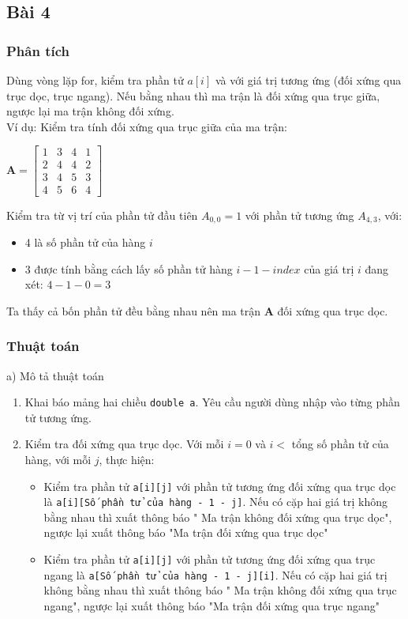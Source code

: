 \documentclass[a4paper]{article}
\begin{document}
\subsection{Bài 4}
\subsubsection{Phân tích}
Dùng vòng lặp for, kiểm tra phần tử $a[i]$ và với giá trị tương ứng (đối xứng qua trục dọc, trục ngang). Nếu bằng nhau thì ma trận là đối xứng qua trục giữa, ngược lại ma trận không đối xứng.\\

Ví dụ: Kiểm tra tính đối xứng qua trục giữa của ma trận:

$ \mathbf{A} = \begin{bmatrix}
1 & 3 & 4 & 1 \\
2 & 4 & 4 & 2 \\
3 & 4 & 5 & 3 \\
4 & 5 & 6 & 4 
\end{bmatrix}  $

Kiểm tra từ vị trí của phần tử đầu tiên $A_{0,0} =1$ với phần tử tương ứng $A_{4,3}$, với:
\begin{itemize}
    \item 4 là số phần tử của hàng $i$
    \item 3 được tính bằng cách lấy số phần tử hàng $i - 1 - index$ của giá trị $i$ đang xét: $4 - 1 - 0 = 3$
\end{itemize}

Ta thấy cả bốn phần tử đều bằng nhau nên ma trận $\mathbf{A}$ đối xứng qua trục dọc. 
\subsubsection{Thuật toán}
a) Mô tả thuật toán
\begin{enumerate}
    \item Khai báo mảng hai chiều \texttt{double a}. Yêu cầu người dùng nhập vào từng phần tử tương ứng.
    \item Kiểm tra đối xứng qua trục dọc. Với mỗi $i = 0$ và $i <$ tổng số phần tử của hàng, với mỗi $j$, thực hiện:
    \begin{itemize}
        \item Kiểm tra phần tử \texttt{a[i][j]} với phần tử tương ứng đối xứng qua trục dọc là \texttt{a[i][Số phần tử của hàng - 1 - j]}. Nếu có cặp hai giá trị không bằng nhau thì xuất thông báo " Ma trận không đối xứng qua trục dọc", ngược lại xuất thông báo "Ma trận đối xứng qua trục dọc"
        \item Kiểm tra phần tử \texttt{a[i][j]} với phần tử tương ứng đối xứng qua trục ngang là \texttt{a[Số phần tử của hàng - 1 - j][i]}. Nếu có cặp hai giá trị không bằng nhau thì xuất thông báo " Ma trận không đối xứng qua trục ngang", ngược lại xuất thông báo "Ma trận đối xứng qua trục ngang"
    \end{itemize}
\end{enumerate}
\end{document}
